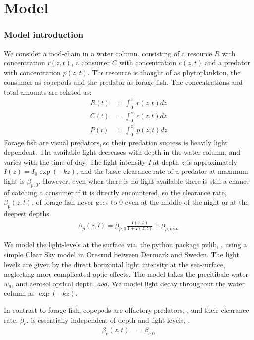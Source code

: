 
\section{Model}
\subsubsection*{Model introduction}
We consider a food-chain in a water column, consisting of a resource $R$ with concentration $r(z,t)$, a consumer $C$ with concentration $c(z,t)$ and a predator with concentration $p(z,t)$. The resource is thought of as phytoplankton, the consumer as copepods and the predator as forage fish. The concentrations and total amounts are related as:
\begin{align}
        R(t) &= \int_0^{z_0} r(z,t) dz \\
	      C(t) &= \int_0^{z_0} c(z,t) dz \\
	      P(t) &= \int_0^{z_0} p(z,t) dz
\end{align}
Forage fish are visual predators, so their predation success is heavily light dependent. The available light decreases with depth in the water column, and varies with the time of day.
The light intensity $I$ at depth $z$ is approximately $I(z) = I_0\exp(-kz)$, and the basic clearance rate of a predator at maximum light is $\beta_{p,0}$.  However, even when there is no light available there is still a chance of catching a consumer if it is directly encountered,  so the clearance rate, $\beta_p(z,t)$, of forage fish never goes to 0 even at the middle of the night or at the deepest depths.
\begin{align}
  \beta_p(z,t) = \beta_{p,0} \frac{I(z,t)}{1+I(z,t)} + \beta_{p,min}
\end{align}


We model the light-levels at the surface via. the python package pvlib, \citep{}, using a simple Clear Sky model in Oresund between Denmark and Sweden. The light levels are given by the direct horizontal light intensity at the sea-surface, neglecting more complicated optic effects. The model takes the precitibale water $w_a$, and aerosol optical depth, $aod$. We model light decay throughout the water column as $\exp(-kz)$.


In contrast to forage fish, copepods are olfactory predators, \citep{}, and their clearance rate, $\beta_c$, is essentially independent of depth and light levels, \citep{}.
\begin{align}
	\beta_c(z,t) &=  \beta_{c,0}
\end{align}

